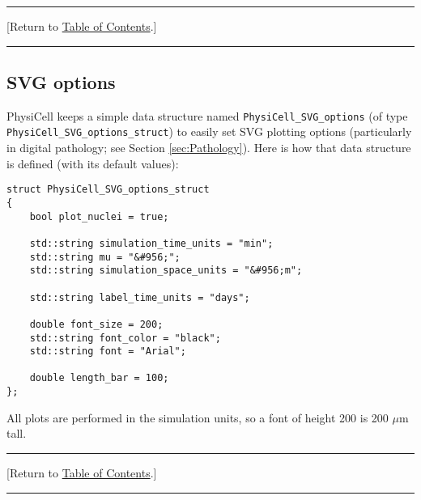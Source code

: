 \documentclass[12pt]{article}
\newcommand{\micron}{\mu\textrm{m}}
\renewcommand{\v}{\verb}
\newcommand{\blue}[1]{\textcolor{blue}{#1}}
\newcommand{\DONE}{}%
\newcommand{\TOClink}{\begin{center}\hrule\vskip-10pt\phantom{.}\hfill[Return to \hyperlink{TOC}{Table of Contents}.]\hfill\phantom{.}\vskip3pt\hrule\end{center}}
\begin{document}
\TOClink 

\subsection{SVG options \DONE}
\label{sec:SVG_options}
PhysiCell keeps a simple data structure named 
\v|PhysiCell_SVG_options| (of type \\
\v|PhysiCell_SVG_options_struct|) to easily 
set SVG plotting options (particularly in 
digital pathology; see Section \ref{sec:Pathology}). Here 
is how that data structure is defined (with its 
default values): 

\begin{verbatim}
struct PhysiCell_SVG_options_struct
{
    bool plot_nuclei = true; 

    std::string simulation_time_units = "min";
    std::string mu = "&#956;";
    std::string simulation_space_units = "&#956;m";
    
    std::string label_time_units = "days"; 
    
    double font_size = 200; 
    std::string font_color = "black";
    std::string font = "Arial";

    double length_bar = 100; 
}; 
\end{verbatim}
All plots are performed in the simulation units, so a font of height 200 
is 200 $\micron$ tall. 

\TOClink 
\end{document}
